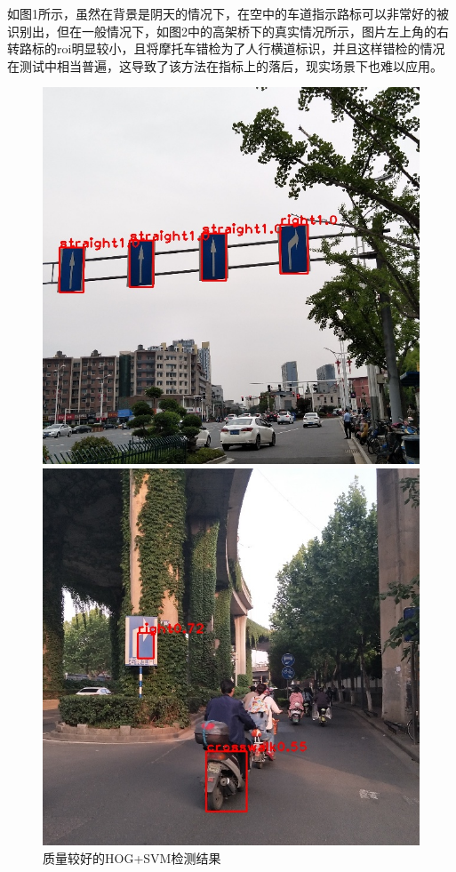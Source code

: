 \documentclass{article}
\begin{document}
如图1所示，虽然在背景是阴天的情况下，在空中的车道指示路标可以非常好的被识别出，但在一般情况下，如图2中的高架桥下的真实情况所示，图片左上角的右转路标的roi明显较小，且将摩托车错检为了人行横道标识，并且这样错检的情况在测试中相当普遍，这导致了该方法在指标上的落后，现实场景下也难以应用。
\begin{figure}[H]
    \centering
    \begin{minipage}[t]{0.49\linewidth}
        \centering
        \includegraphics[width=1\linewidth, trim=0 50 0 50, clip]{test_results/sign_433_result.jpg}
        \caption{质量较好的HOG+SVM检测结果}
        \label{fig:1}
    \end{minipage}
    \begin{minipage}[t]{0.49\linewidth}
        \centering
        \includegraphics[width=1\linewidth, trim=50 30 50 160, clip]{test_results/sign_120_result.jpg}

\end{minipage}
\end{figure}
\end{document}
